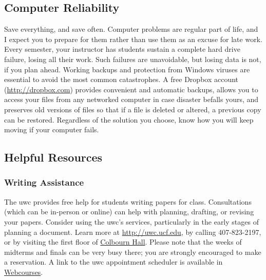\documentclass[11pt, twosides]{amsart}	%
\begin{document}
\subsection{Computer Reliability}\label{sub:reliability}
Save everything, and save often.  Computer problems are regular part of life, and I expect you to prepare for them rather than use them as an excuse for late work. Every semester, your instructor has students sustain a complete hard drive failure, losing all their work. Such failures are unavoidable, but losing data is not, if you plan ahead. Working backups and protection from Windows viruses are essential to avoid the most common catastrophes.  A free Dropbox account (\href{http://db.tt/mzWxY8s}{http://dropbox.com}) provides convenient and automatic backups, allows you to access your files from any networked computer in case disaster befalls yours, and preserves old versions of files so that if a file is deleted or altered, a previous copy can be restored. Regardless of the solution you choose, know how you will keep moving if your computer fails.

\subsection{Helpful Resources} %
\label{sub:helpful_resources}
\subsubsection{Writing Assistance}\label{ssub:uwc}
The \ac{uwc} provides free help for students writing papers for class.  Consultations (which can be in-person or online) can help with planning, drafting, or revising your papers.  Consider using the \ac{uwc}'s services, particularly in the early stages of planning a document.  Learn more at \href{http://uwc.ucf.edu/}{http://uwc.ucf.edu}, by calling 407-823-2197, or by visiting the first floor of \href{https://www.map.ucf.edu/locations/18/colbourn-hall/}{Colbourn Hall}.  Please note that the weeks of midterms and finals can be very busy there; you are strongly encouraged to make a reservation. A link to the \ac{uwc} appointment scheduler is available in \href{http://webcourses.instructure.com}{Webcourses}.

\end{document}

